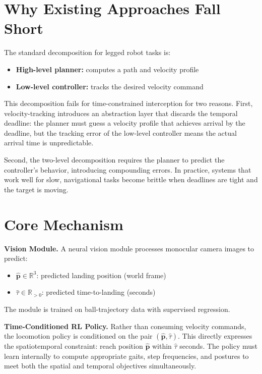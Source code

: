 \documentclass[10pt,twocolumn]{article}
\begin{document}
\section{Why Existing Approaches Fall Short}

The standard decomposition for legged robot tasks is:
\begin{itemize}[itemsep=2pt,parsep=0pt]
  \item \textbf{High-level planner:} computes a path and velocity profile
  \item \textbf{Low-level controller:} tracks the desired velocity command
\end{itemize}

This decomposition fails for time-constrained interception for two reasons.
First, velocity-tracking introduces an abstraction layer that discards the
temporal deadline: the planner must guess a velocity profile that achieves
arrival by the deadline, but the tracking error of the low-level controller
means the actual arrival time is unpredictable.

Second, the two-level decomposition requires the planner to predict the
controller's behavior, introducing compounding errors. In practice, systems
that work well for slow, navigational tasks become brittle when deadlines
are tight and the target is moving.

\section{Core Mechanism}

\textbf{Vision Module.}
A neural vision module processes monocular camera images to predict:
\begin{itemize}[itemsep=2pt,parsep=0pt]
  \item $\hat{\mathbf{p}} \in \mathbb{R}^3$: predicted landing position (world frame)
  \item $\hat{\tau} \in \mathbb{R}_{>0}$: predicted time-to-landing (seconds)
\end{itemize}
The module is trained on ball-trajectory data with supervised regression.

\textbf{Time-Conditioned RL Policy.}
Rather than consuming velocity commands, the locomotion policy is conditioned on the
pair $(\hat{\mathbf{p}}, \hat{\tau})$. This directly expresses the spatiotemporal
constraint: reach position $\hat{\mathbf{p}}$ within $\hat{\tau}$ seconds. The
policy must learn internally to compute appropriate gaits, step frequencies, and
postures to meet both the spatial and temporal objectives simultaneously.
\end{document}
